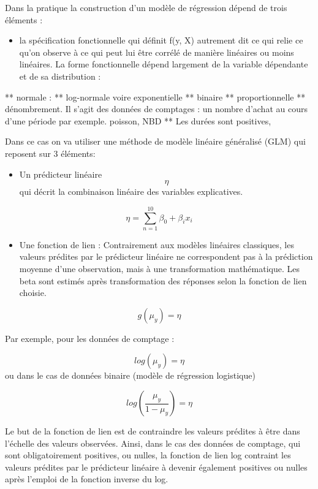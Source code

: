 \documentclass[
]{book}
\providecommand{\tightlist}{%
  \setlength{\itemsep}{0pt}\setlength{\parskip}{0pt}}
\begin{document}
Dans la pratique la construction d'un modèle de régression dépend de trois éléments :

\begin{itemize}
\tightlist
\item
  la spécification fonctionnelle qui définit f(y, X) autrement dit ce qui relie ce qu'on observe à ce qui peut lui être corrélé de manière linéaires ou moins linéaires. La forme fonctionnelle dépend largement de la variable dépendante et de sa distribution :
\end{itemize}

** normale :
** log-normale voire exponentielle
** binaire
** proportionnelle
** dénombrement. Il s'agit des données de comptages : un nombre d'achat au cours d'une période par exemple. poisson, NBD
** Les durées sont positives,

Dans ce cas on va utiliser une méthode de modèle linéaire généralisé (GLM) qui reposent sur 3 éléments:

\begin{itemize}
\tightlist
\item
  Un prédicteur linéaire \[\eta\] qui décrit la combinaison linéaire des variables explicatives.
\end{itemize}

\[\eta=\sum_{n=1}^{10}\beta_{0}+\beta_{i}x_{i}\]

\begin{itemize}
\tightlist
\item
  Une fonction de lien : Contrairement aux modèles linéaires classiques, les valeurs prédites par le prédicteur linéaire ne correspondent pas à la prédiction moyenne d'une observation, mais à une transformation mathématique. Les beta sont estimés après transformation des réponses selon la fonction de lien choisie.
\end{itemize}

\[g(\mu_{y})=\eta\]

Par exemple, pour les données de comptage :

\[log(\mu_{y})=\eta\]
ou dans le cas de données binaire (modèle de régression logistique)

\[log(\frac{\mu_{y}}{1-\mu_{y}})=\eta\]

Le but de la fonction de lien est de contraindre les valeurs prédites à être dans l'échelle des valeurs observées. Ainsi, dans le cas des données de comptage, qui sont obligatoirement positives, ou nulles, la fonction de lien log contraint les valeurs prédites par le prédicteur linéaire à devenir également positives ou nulles après l'emploi de la fonction inverse du log.
\end{document}

